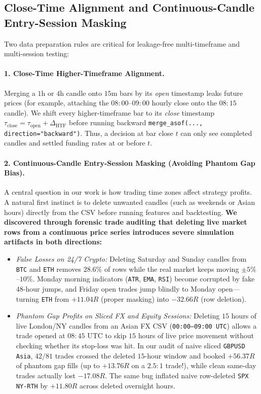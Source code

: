 \documentclass{article}
\begin{document}
\subsection{Close-Time Alignment and Continuous-Candle Entry-Session Masking}

Two data preparation rules are critical for leakage-free multi-timeframe and multi-session testing:

\paragraph{1. Close-Time Higher-Timeframe Alignment.}
Merging a $1\text{h}$ or $4\text{h}$ candle onto $15\text{m}$ bars by its \emph{open} timestamp leaks future prices (for example, attaching the $08{:}00$--$09{:}00$ hourly close onto the $08{:}15$ candle). We shift every higher-timeframe bar to its \emph{close} timestamp $\tau_{\mathrm{close}} = \tau_{\mathrm{open}} + \Delta_{\mathrm{HTF}}$ before running backward \texttt{merge\_asof(..., direction="backward")}. Thus, a decision at bar close $t$ can only see completed candles and settled funding rates at or before $t$.

\paragraph{2. Continuous-Candle Entry-Session Masking (Avoiding Phantom Gap Bias).}
A central question in our work is how trading time zones affect strategy profits. A natural first instinct is to delete unwanted candles (such as weekends or Asian hours) directly from the CSV before running features and backtesting. \textbf{We discovered through forensic trade auditing that deleting live market rows from a continuous price series introduces severe simulation artifacts in both directions:}
\begin{itemize}
    \item \emph{False Losses on 24/7 Crypto:} Deleting Saturday and Sunday candles from \texttt{BTC} and \texttt{ETH} removes $28.6\%$ of rows while the real market keeps moving $\pm 5\%$--$10\%$. Monday morning indicators (\texttt{ATR}, \texttt{EMA}, \texttt{RSI}) become corrupted by fake $48$-hour jumps, and Friday open trades jump blindly to Monday open—turning \texttt{ETH} from $+11.04R$ (proper masking) into $-32.66R$ (row deletion).
    \item \emph{Phantom Gap Profits on Sliced FX and Equity Sessions:} Deleting $15$ hours of live London/NY candles from an Asian FX CSV (\texttt{00:00--09:00 UTC}) allows a trade opened at $08{:}45$ UTC to skip $15$ hours of live price movement without checking whether its stop-loss was hit. In our audit of naive sliced \texttt{GBPUSD Asia}, $42/81$ trades crossed the deleted $15$-hour window and booked $+56.37R$ of phantom gap fills (up to $+13.76R$ on a $2.5{:}1$ trade!), while clean same-day trades actually lost $-17.08R$. The same bug inflated naive row-deleted \texttt{SPX NY-RTH} by $+11.80R$ across deleted overnight hours.
\end{itemize}
\end{document}
